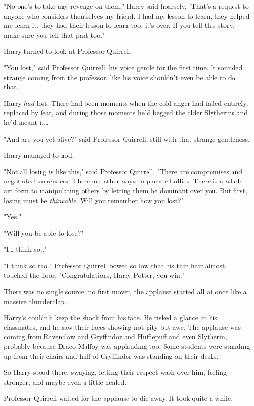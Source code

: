 "No one's to take any revenge on them," Harry said hoarsely. "That's a request 
to anyone who considers themselves my friend. I had my lesson to learn, they 
helped me learn it, they had their lesson to learn too, it's over. If you tell 
this story, make sure you tell that part too."

Harry turned to look at Professor Quirrell.

"You lost," said Professor Quirrell, his voice gentle for the first time. It 
sounded strange coming from the professor, like his voice shouldn't even be 
able to do that.

Harry \emph{had} lost. There had been moments when the cold anger had faded 
entirely, replaced by fear, and during those moments he'd begged the older 
Slytherins and he'd meant it{\ldots}

"And are you yet alive?" said Professor Quirrell, still with that strange 
gentleness.

Harry managed to nod.

"Not all losing is like this," said Professor Quirrell. "There are compromises 
and negotiated surrenders. There are other ways to placate bullies. There is a 
whole art form to manipulating others by letting them be dominant over you. But 
first, losing must be \emph{thinkable}. Will you remember how you lost?"

"Yes."

"Will you be able to lose?"

"I{\ldots} think so{\ldots}"

"I think so too." Professor Quirrell bowed so low that his thin hair almost 
touched the floor. "Congratulations, Harry Potter, you win."

There was no single source, no first mover, the applause started all at once 
like a massive thunderclap.

Harry's couldn't keep the shock from his face. He risked a glance at his 
classmates, and he saw their faces showing not pity but awe. The applause was 
coming from Ravenclaw and Gryffindor and Hufflepuff and even Slytherin, 
probably because Draco Malfoy was applauding too. Some students were standing 
up from their chairs and half of Gryffindor was standing on their desks.

So Harry stood there, swaying, letting their respect wash over him, feeling 
stronger, and maybe even a little healed.

Professor Quirrell waited for the applause to die away. It took quite a while.

